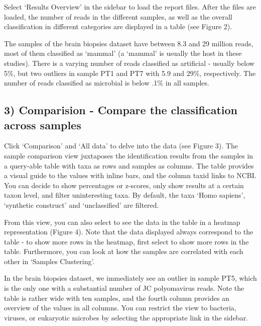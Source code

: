 \documentclass[]{article}
\begin{document}
Select `Results Overview' in the sidebar to load the report files. After
the files are loaded, the number of reads in the different samples, as
well as the overall classification in different categories are displayed
in a table (see Figure 2).

The samples of the brain biopsies dataset have between 8.3 and 29
million reads, most of them classified as `mammal' (a `mammal' is
usually the host in these studies). There is a varying number of reads
classified as artificial - usually below 5\%, but two outliers in sample
PT1 and PT7 with 5.9 and 29\%, respectively. The number of reads
classified as microbial is below .1\% in all samples.

\subsection{3) Comparision - Compare the classification across
samples}\label{comparision---compare-the-classification-across-samples}

Click `Comparison' and `All data' to delve into the data (see Figure 3).
The sample comparison view juxtaposes the identification results from
the samples in a query-able table with taxa as rows and samples as
columns. The table provides a visual guide to the values with inline
bars, and the column taxid links to NCBI. You can decide to show
percentages or z-scores, only show results at a certain taxon level, and
filter uninteresting taxa. By default, the taxa `Homo sapiens',
`synthetic construct' and `unclassified' are filtered.

From this view, you can also select to see the data in the table in a
heatmap representation (Figure 4). Note that the data displayed always
correspond to the table - to show more rows in the heatmap, first select
to show more rows in the table. Furthermore, you can look at how the
samples are correlated with each other in `Samples Clustering'.

In the brain biopsies dataset, we immediately see an outlier in sample
PT5, which is the only one with a substantial number of JC polyomavirus
reads. Note the table is rather wide with ten samples, and the fourth
column provides an overview of the values in all columns. You can
restrict the view to bacteria, viruses, or eukaryotic microbes by
selecting the appropriate link in the sidebar.
\end{document}
